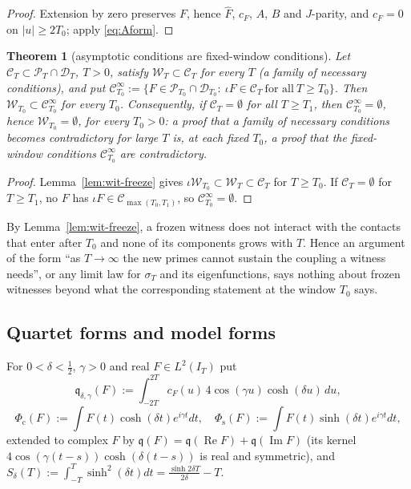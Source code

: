\documentclass[11pt]{amsart}
\newtheorem{theorem}{Theorem}[section]
\theoremstyle{definition}
\theoremstyle{remark}
\newcommand{\Rel}{\operatorname{Re}}
\newcommand{\Iml}{\operatorname{Im}}
\newcommand{\PT}{\mathcal P_T}
\newcommand{\IT}{I_T}
\newcommand{\sT}{\sigma_T}
\newcommand{\Fh}{\widehat F}
\newcommand{\cF}{c_F}
\begin{document}
\begin{proof}
Extension by zero preserves $F$, hence $\Fh$, $\cF$, $A$, $B$ and $J$-parity, and $\cF=0$ on $|u|\ge2T_0$; apply
\eqref{eq:Aform}.
\end{proof}

\begin{theorem}[asymptotic conditions are fixed-window conditions]\label{thm:wit-asym}
Let $\mathscr C_T\subset\PT\cap\mathcal D_T$, $T>0$, satisfy $\mathscr W_T\subset\mathscr C_T$ for every $T$ (a family of
necessary conditions), and put $\mathscr C^\infty_{T_0}:=\{F\in\mathcal P_{T_0}\cap\mathcal D_{T_0}:\ \iota F\in\mathscr C_T\ \text{for all}\
T\ge T_0\}$. Then $\mathscr W_{T_0}\subset\mathscr C^\infty_{T_0}$ for every $T_0$. Consequently, if $\mathscr C_T=\emptyset$ for all
$T\ge T_1$, then $\mathscr C^\infty_{T_0}=\emptyset$, hence $\mathscr W_{T_0}=\emptyset$, for every $T_0>0$: a proof that a
family of necessary conditions becomes contradictory for large $T$ is, at each fixed $T_0$, a proof that the
fixed-window conditions $\mathscr C^\infty_{T_0}$ are contradictory.
\end{theorem}

\begin{proof}
Lemma~\ref{lem:wit-freeze} gives $\iota\mathscr W_{T_0}\subset\mathscr W_T\subset\mathscr C_T$ for $T\ge T_0$. If
$\mathscr C_T=\emptyset$ for $T\ge T_1$, no $F$ has $\iota F\in\mathscr C_{\max(T_0,T_1)}$, so $\mathscr C^\infty_{T_0}=\emptyset$.
\end{proof}

By Lemma~\ref{lem:wit-freeze}, a frozen witness does not interact with the contacts that enter after $T_0$ and
none of its components grows with $T$. Hence an argument of the form ``as $T\to\infty$ the new primes cannot sustain the
coupling a witness needs'', or any limit law for $\sT$ and its eigenfunctions, says nothing about frozen witnesses
beyond what the corresponding statement at the window $T_0$ says.

\subsection{Quartet forms and model forms}
For $0<\delta<\frac12$, $\gamma>0$ and real $F\in L^2(\IT)$ put
\[
\mathfrak q_{\delta,\gamma}(F):=\int_{-2T}^{2T}\cF(u)\,4\cos(\gamma u)\cosh(\delta u)\,du,\]\[
\Phi_{\mathrm c}(F):=\int F(t)\cosh(\delta t)e^{i\gamma t}dt,\quad \Phi_{\mathrm s}(F):=\int F(t)\sinh(\delta t)e^{i\gamma t}dt,
\]
extended to complex $F$ by $\mathfrak q(F)=\mathfrak q(\Rel F)+\mathfrak q(\Iml F)$ (its kernel $4\cos(\gamma(t-s))\cosh(\delta(t-s))$ is real
and symmetric), and $S_\delta(T):=\int_{-T}^T\sinh^2(\delta t)dt=\frac{\sinh2\delta T}{2\delta}-T$.
\end{document}
